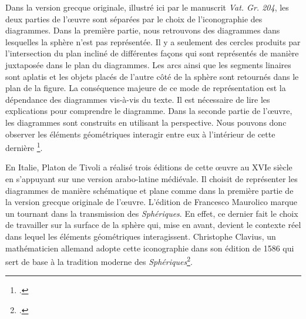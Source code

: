Dans la version grecque originale, illustré ici par le manuscrit \textit{Vat. Gr. 204}, les deux parties de l'œuvre sont séparées par le choix de l'iconographie des diagrammes. Dans la première partie, nous retrouvons des diagrammes dans lesquelles la sphère n'est pas représentée. Il y a seulement des cercles produits par l'intersection du plan incliné de différentes façons qui sont représentés de manière juxtaposée dans le plan du diagrammes. Les arcs ainsi que les segments linaires sont aplatis et les objets placés de l'autre côté de la sphère sont retournés dans le plan de la figure. La conséquence majeure de ce mode de représentation est la dépendance des diagrammes vis-à-vis du texte. Il est nécessaire de lire les explications pour comprendre le diagramme. Dans la seconde partie de l'œuvre, les diagrammes sont construits en utilisant la perspective. Nous pouvons donc observer les éléments géométriques interagir entre eux à l'intérieur de cette dernière \footcite{malpangottoGraphicalChoicesGeometrical2010}.  

En Italie, Platon de Tivoli a réalisé trois éditions de cette œuvre au XVIe siècle en s'appuyant sur une version arabo-latine médiévale. Il choisit de représenter les diagrammes de manière schématique et plane comme dans la première partie de la version grecque originale de l'œuvre. L'édition de Francesco Maurolico marque un tournant dans la transmission des \textit{Sphériques}. En effet, ce dernier fait le choix de travailler sur la surface de la sphère qui, mise en avant, devient le contexte réel dans lequel les éléments géométriques interagissent. Christophe Clavius, un mathématicien allemand adopte cette iconographie dans son édition de 1586 qui sert de base à la tradition moderne des \textit{Sphériques}\footcite{malpangottoGraphicalChoicesGeometrical2010}. 

